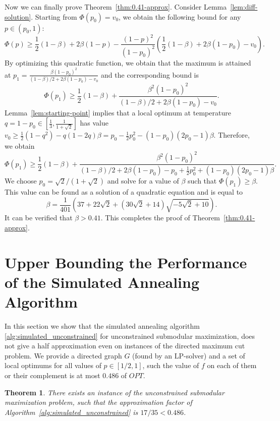 \documentclass{article}[11pt]
\newtheorem{theorem}{Theorem}[section]
\begin{document}
Now we can finally prove Theorem~\ref{thm:0.41-approx}. Consider Lemma~\ref{lem:diff-solution}.
Starting from $\Phi(p_0) = v_0$, we obtain the following bound for any $p \in (p_0,1)$:
$$ \Phi(p) \geq \frac12 (1-\beta) + 2 \beta (1-p) -
 \frac{(1-p)^2}{(1-p_0)^2} \left(\frac12 (1-\beta) + 2 \beta (1-p_0) - v_0 \right).$$
By optimizing this quadratic function, we obtain that the maximum is attained at
$p_1 = \frac{\beta (1-p_0)^2}{(1-\beta)/2 + 2 \beta (1-p_0) - v_0}$ and the corresponding bound is
$$ \Phi(p_1) \geq \frac12 (1-\beta) + \frac{\beta^2 (1-p_0)^2}{(1-\beta)/2 + 2\beta (1-p_0) - v_0}.$$
Lemma~\ref{lem:starting-point} implies that a local optimum at temperature $q=1-p_0
 \in [\frac13, \frac{1}{1+\sqrt{2}}]$ has value
$ v_0 \geq \frac12 (1-q^2) - q(1-2q) \beta = p_0 - \frac12 p_0^2 - (1-p_0)(2 p_0 -1) \beta.$ 
Therefore, we obtain
$$ \Phi(p_1) \geq \frac12 (1-\beta) + \frac{\beta^2 (1-p_0)^2}{(1-\beta)/2
 + 2\beta (1-p_0) - p_0 + \frac12 p_0^2 + (1-p_0)(2 p_0 -1) \beta}.$$ 
We choose $p_0 = \sqrt{2} / (1+\sqrt{2})$ and solve for a value of $\beta$ such that
$\Phi(p_1) \geq \beta$. This value can be found as a solution of a quadratic equation
and is equal to
$$ \beta = \frac{1}{401} \left(37 + 22\sqrt{2} + (30\sqrt{2}+14) \sqrt{-5\sqrt{2} + 10} \right).$$
It can be verified that $\beta > 0.41$.
This completes the proof of Theorem~\ref{thm:0.41-approx}.



\section{Upper Bounding the Performance of the Simulated Annealing Algorithm}
\label{app:tightexample}


In this section we show that the simulated annealing algorithm
\ref{alg:simulated_unconstrained} for unconstrained submodular maximization,
does not give a half approximation even on instances of the directed 
maximum cut problem. We provide a directed graph $G$ (found by an LP-solver)
and a set of local optimums for all values of $p\in [1/2,1]$, such the value
of $f$ on each of them or their complement is at most $0.486$ of $OPT$. 

\begin{theorem}
\label{thm:tightexample}
There exists an instance of the unconstrained submodular maximization problem,
such that the approximation factor of Algorithm~\ref{alg:simulated_unconstrained}
is $17/35 < 0.486$.
\end{theorem}
\end{document}

